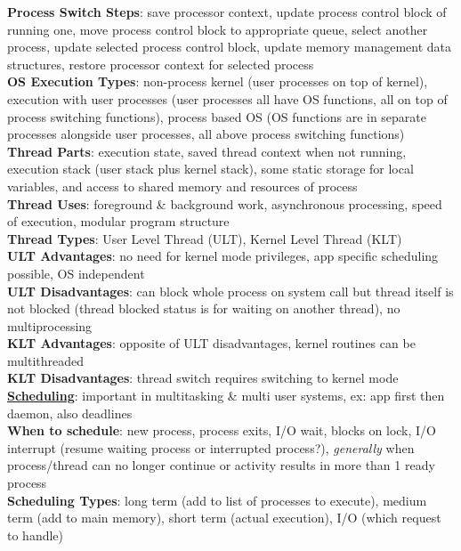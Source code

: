 \documentclass[a4paper]{article}
\begin{document}
\begin{multicols}{2}
        \textbf{Process Switch Steps}: save processor context, update process control block of running one, move process control block to appropriate queue, select another process, update selected process control block, update memory management data structures, restore processor context for selected process\\
        \textbf{OS Execution Types}: non-process kernel (user processes on top of kernel), execution with user processes (user processes all have OS functions, all on top of process switching functions), process based OS (OS functions are in separate processes alongside user processes, all above process switching functions)\\
        \textbf{Thread Parts}: execution state, saved thread context when not running, execution stack (user stack plus kernel stack), some static storage for local variables, and access to shared memory and resources of process\\
        \textbf{Thread Uses}: foreground \& background work, asynchronous processing, speed of execution, modular program structure\\
        \textbf{Thread Types}: User Level Thread (ULT), Kernel Level Thread (KLT)\\
        \textbf{ULT Advantages}: no need for kernel mode privileges, app specific scheduling possible, OS independent\\
        \textbf{ULT Disadvantages}: can block whole process on system call but thread itself is not blocked (thread blocked status is for waiting on another thread), no multiprocessing\\
        \textbf{KLT Advantages}: opposite of ULT disadvantages, kernel routines can be multithreaded\\
        \textbf{KLT Disadvantages}: thread switch requires switching to kernel mode\\
        \underline{\textbf{Scheduling}}: important in multitasking \& multi user systems, ex: app first then daemon, also deadlines\\
        \textbf{When to schedule}: new process, process exits, I/O wait, blocks on lock, I/O interrupt (resume waiting process or interrupted process?), \textit{generally} when process/thread can no longer continue or activity results in more than 1 ready process\\
        \textbf{Scheduling Types}: long term (add to list of processes to execute), medium term (add to main memory), short term (actual execution), I/O (which request to handle)\\

\end{multicols}
\end{document}
